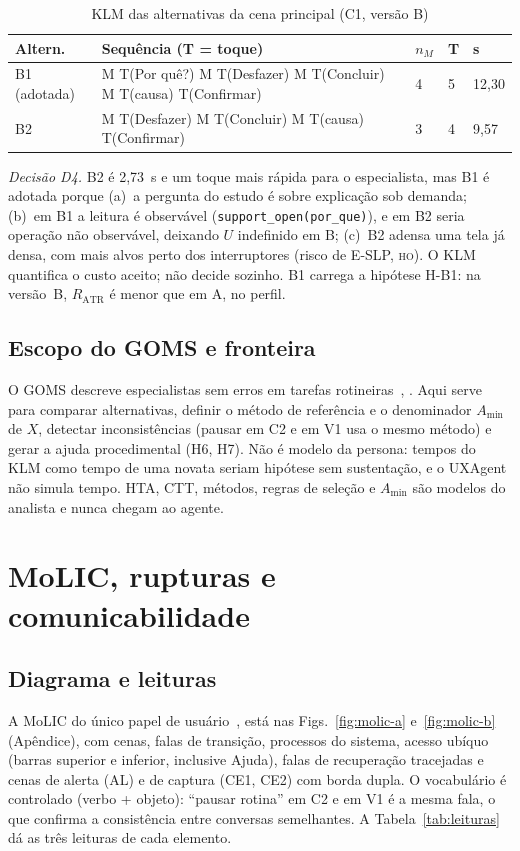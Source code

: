 \documentclass[conference]{IEEEtran}
\newcommand{\stHO}{\textsc{ho}}
\newcommand{\ev}[1]{\texttt{#1}}
\begin{document}
\begin{table}[!t]
\caption{KLM das alternativas da cena principal (C1, versão B)}
\label{tab:klm-alt}
\centering
\scriptsize
\setlength{\tabcolsep}{2.5pt}
\begin{tabularx}{\columnwidth}{@{}P{1.2cm}YP{0.35cm}P{0.35cm}P{0.65cm}@{}}
\toprule
\textbf{Altern.} & \textbf{Sequência (T = toque)} & \textbf{$n_M$} & \textbf{T} & \textbf{s} \\
\midrule
B1 (adotada) & M T(Por quê?) M T(Desfazer) M T(Concluir) M T(causa) T(Confirmar) & 4 & 5 & 12,30 \\
B2 & M T(Desfazer) M T(Concluir) M T(causa) T(Confirmar) & 3 & 4 & 9,57 \\
\bottomrule
\end{tabularx}
\end{table}

\textit{Decisão D4.} B2 é 2,73~s e um toque mais rápida para o especialista, mas B1 é adotada porque (a)~a pergunta do estudo é sobre explicação sob demanda; (b)~em B1 a leitura é observável (\ev{support\_open(por\_que)}), e em B2 seria operação não observável, deixando $U$ indefinido em B; (c)~B2 adensa uma tela já densa, com mais alvos perto dos interruptores (risco de E-SLP, \stHO). O KLM quantifica o custo aceito; não decide sozinho. B1 carrega a hipótese H-B1: na versão~B, $R_{\mathrm{ATR}}$ é menor que em A, no perfil.

\subsection{Escopo do GOMS e fronteira}
O GOMS descreve especialistas sem erros em tarefas rotineiras~\cite{barbosa2010}, \cite{preece2002}. Aqui serve para comparar alternativas, definir o método de referência e o denominador $A_{\min}$ de $X$, detectar inconsistências (pausar em C2 e em V1 usa o mesmo método) e gerar a ajuda procedimental (H6, H7). Não é modelo da persona: tempos do KLM como tempo de uma novata seriam hipótese sem sustentação, e o UXAgent não simula tempo. HTA, CTT, métodos, regras de seleção e $A_{\min}$ são modelos do analista e nunca chegam ao agente.

\section{MoLIC, rupturas e comunicabilidade}\label{sec:molic}

\subsection{Diagrama e leituras}
A MoLIC do único papel de usuário~\cite{barbosa2003molic}, \cite{barbosa2010} está nas Figs.~\ref{fig:molic-a} e~\ref{fig:molic-b} (Apêndice), com cenas, falas de transição, processos do sistema, acesso ubíquo (barras superior e inferior, inclusive Ajuda), falas de recuperação tracejadas e cenas de alerta (AL) e de captura (CE1, CE2) com borda dupla. O vocabulário é controlado (verbo + objeto): ``pausar rotina'' em C2 e em V1 é a mesma fala, o que confirma a consistência entre conversas semelhantes. A Tabela~\ref{tab:leituras} dá as três leituras de cada elemento.
\end{document}
